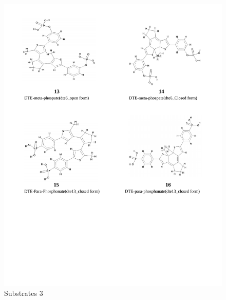 \documentclass[12pt,twoside]{reedthesis}
\begin{document}
  \begin{figure}[h!tbp]
   \centering
   \includegraphics[angle = 0,scale = 1]{chapter4/esquema_quimico-3-3.pdf}
   \caption[Substrates 3]{\normalsize{Substrates 3}}
   \label{fig:Substrates chemical 3}
   \end{figure}
  
\end{document}
